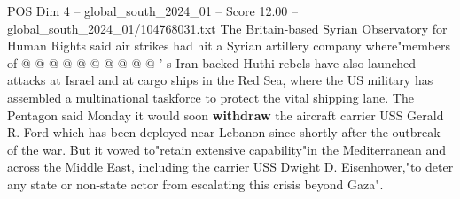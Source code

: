 \begin{textsample}{POS Dim 4 – global\_south\_2024\_01 – Score 12.00 – global\_south\_2024\_01/104768031.txt}
The Britain-based Syrian Observatory for Human Rights said air strikes had hit a Syrian artillery company where"members of @ @ @ @ @ @ @ @ @ @ ' s Iran-backed Huthi rebels have also launched attacks at Israel and at cargo ships in the Red Sea, where the US military has assembled a multinational taskforce to protect the vital shipping lane.
The Pentagon said Monday it would soon \textbf{withdraw} the aircraft carrier USS Gerald R.
Ford which has been deployed near Lebanon since shortly after the outbreak of the war.
But it vowed to"retain extensive capability"in the Mediterranean and across the Middle East, including the carrier USS Dwight D.
Eisenhower,"to deter any state or non-state actor from escalating this crisis beyond Gaza".

\end{textsample}
